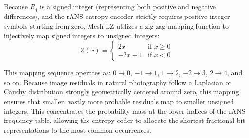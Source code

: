 Because $R_q$ is a signed integer (representing both positive and negative differences), and the rANS entropy encoder strictly requires positive integer symbols starting from zero, Mesh-LZ utilizes a zig-zag mapping function to injectively map signed integers to unsigned integers:
\begin{equation}
    Z(x) = 
    \begin{cases} 
      2x & \text{if } x \ge 0 \\
      -2x - 1 & \text{if } x < 0 
   \end{cases}
\end{equation}

This mapping sequence operates as: $0 \rightarrow 0$, $-1 \rightarrow 1$, $1 \rightarrow 2$, $-2 \rightarrow 3$, $2 \rightarrow 4$, and so on. Because image residuals in natural photography follow a Laplacian or Cauchy distribution strongly geometrically centered around zero, this mapping ensures that smaller, vastly more probable residuals map to smaller unsigned integers. This concentrates the probability mass at the lower indices of the rANS frequency table, allowing the entropy coder to allocate the shortest fractional bit representations to the most common occurrences.
